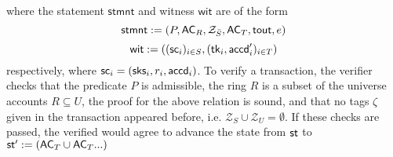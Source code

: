 where the statement $\mathsf{stmnt}$ and witness $\mathsf{wit}$ are of the form
\begin{equation*}
\mathsf{stmnt} := (P,\mathsf{AC}_R,\mathcal{Z}_{\bar{S}}, \mathsf{AC}_T, \mathsf{tout}, e) \\
\end{equation*}
\begin{equation*}
	\mathsf{wit} := ((\mathsf{sc}_i)_{i\in S}, (\mathsf{tk}_i, \mathsf{accd}'_i)_{i\in T}) \\
\end{equation*}
respectively, where $\mathsf{sc}_i = (\mathsf{sks}_i, r_i, \mathsf{accd}_i)$. To verify a transaction, the verifier checks that the predicate $P$ is admissible, the ring $R$ is a subset of the universe accounts $R \subseteq U$, the proof for the above relation is sound, and that no tags $\zeta$ given in the transaction appeared before, i.e. $\mathcal{Z}_S \cup \mathcal{Z}_U = \emptyset$. 
If these checks are passed, the verified would agree to advance the state from $\st$ to $\st' := (\mathsf{AC}_T \cup \mathsf{AC}_T ...)$

